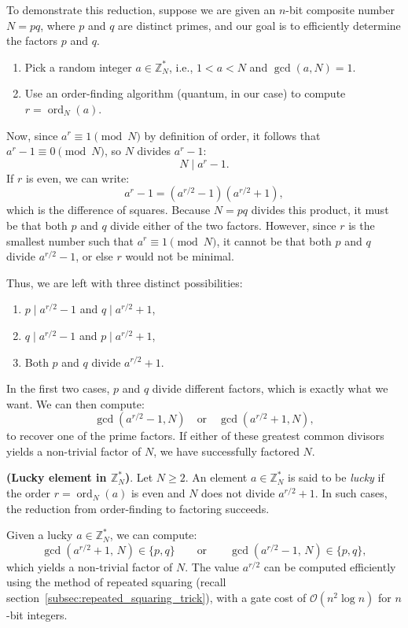 To demonstrate this reduction, suppose we are given an $n$-bit composite number $N = pq$, where $p$ and $q$ are distinct primes, and our goal is to efficiently determine the factors $p$ and $q$. 

\begin{enumerate}
    \item Pick a random integer $a \in \mathbb{Z}_N^*$, i.e., $1 < a < N$ and $\gcd(a, N) = 1$.
    \item Use an order-finding algorithm (quantum, in our case) to compute $r = \operatorname{ord}_N(a)$.
\end{enumerate}

Now, since $a^r \equiv 1 \pmod{N}$ by definition of order, it follows that $a^r - 1 \equiv 0 \pmod{N}$, so $N$ divides $a^r - 1$:
\[
N \mid a^r - 1.
\]
If $r$ is even, we can write:
\[
a^r - 1 = \left(a^{r/2} - 1\right)\left(a^{r/2} + 1\right),
\]
which is the difference of squares. Because $N = pq$ divides this product, it must be that both $p$ and $q$ divide either of the two factors. However, since $r$ is the smallest number such that $a^r \equiv 1 \pmod{N}$, it cannot be that both $p$ and $q$ divide $a^{r/2} - 1$, or else $r$ would not be minimal.

Thus, we are left with three distinct possibilities:
\begin{enumerate}
    \item $p \mid a^{r/2} - 1$ and $q \mid a^{r/2} + 1$,
    \item $q \mid a^{r/2} - 1$ and $p \mid a^{r/2} + 1$,
    \item Both $p$ and $q$ divide $a^{r/2} + 1$.
\end{enumerate}

In the first two cases, $p$ and $q$ divide different factors, which is exactly what we want. We can then compute:
\[
\gcd(a^{r/2} - 1, N) \quad \text{or} \quad \gcd(a^{r/2} + 1, N),
\]
to recover one of the prime factors. If either of these greatest common divisors yields a non-trivial factor of $N$, we have successfully factored $N$.


\begin{definition}
    \textbf{(Lucky element in $\mathbb{Z}_N^*$)}.  
    Let $N \geq 2$. An element $a \in \mathbb{Z}_N^*$ is said to be \emph{lucky} if the order $r = \operatorname{ord}_N(a)$ is even and $N$ does not divide $a^{r/2} + 1$. In such cases, the reduction from order-finding to factoring succeeds.
\end{definition}

Given a lucky $a \in \mathbb{Z}_N^*$, we can compute:
\[
\gcd(a^{r/2} + 1,\, N) \in \{p, q\} \qquad \text{or} \qquad \gcd(a^{r/2} - 1,\, N) \in \{p, q\},
\]
which yields a non-trivial factor of $N$. The value $a^{r/2}$ can be computed efficiently using the method of repeated squaring (recall section~\ref{subsec:repeated_squaring_trick}), with a gate cost of $\mathcal{O}(n^2 \log n)$ for $n$-bit integers.

